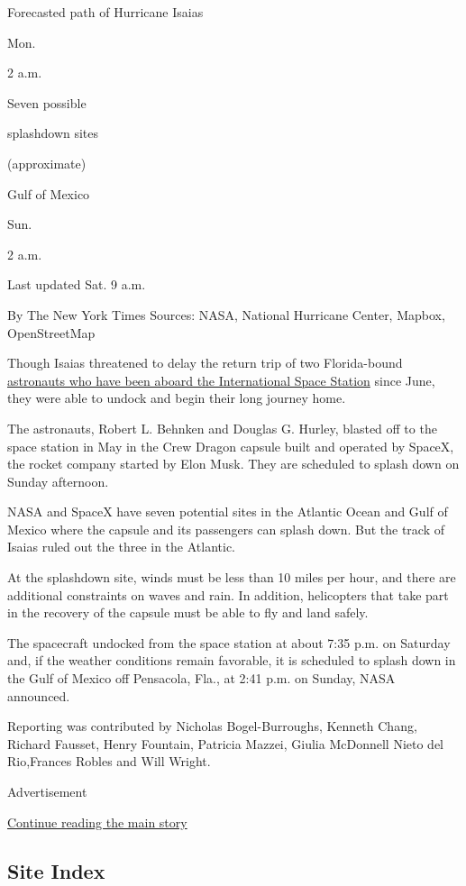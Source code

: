 Forecasted path of Hurricane Isaias

Mon.

2 a.m.

Seven possible

splashdown sites

(approximate)

Gulf of Mexico

Sun.

2 a.m.

Last updated Sat. 9 a.m.

By The New York Times \textbar{} Sources: NASA, National Hurricane
Center, Mapbox, OpenStreetMap

Though Isaias threatened to delay the return trip of two Florida-bound
\href{https://www.nytimes.com/2020/08/01/science/nasa-spacex-astronauts.html}{astronauts
who have been aboard the International Space Station} since June, they
were able to undock and begin their long journey home.

The astronauts, Robert L. Behnken and Douglas G. Hurley, blasted off to
the space station in May in the Crew Dragon capsule built and operated
by SpaceX, the rocket company started by Elon Musk. They are scheduled
to splash down on Sunday afternoon.

NASA and SpaceX have seven potential sites in the Atlantic Ocean and
Gulf of Mexico where the capsule and its passengers can splash down. But
the track of Isaias ruled out the three in the Atlantic.

At the splashdown site, winds must be less than 10 miles per hour, and
there are additional constraints on waves and rain. In addition,
helicopters that take part in the recovery of the capsule must be able
to fly and land safely.

The spacecraft undocked from the space station at about 7:35 p.m. on
Saturday and, if the weather conditions remain favorable, it is
scheduled to splash down in the Gulf of Mexico off Pensacola, Fla., at
2:41 p.m. on Sunday, NASA announced.

Reporting was contributed by Nicholas Bogel-Burroughs, Kenneth Chang,
Richard Fausset, Henry Fountain, Patricia Mazzei, Giulia McDonnell Nieto
del Rio,Frances Robles and Will Wright.

Advertisement

\protect\hyperlink{after-bottom}{Continue reading the main story}

\hypertarget{site-index}{%
\subsection{Site Index}\label{site-index}}

